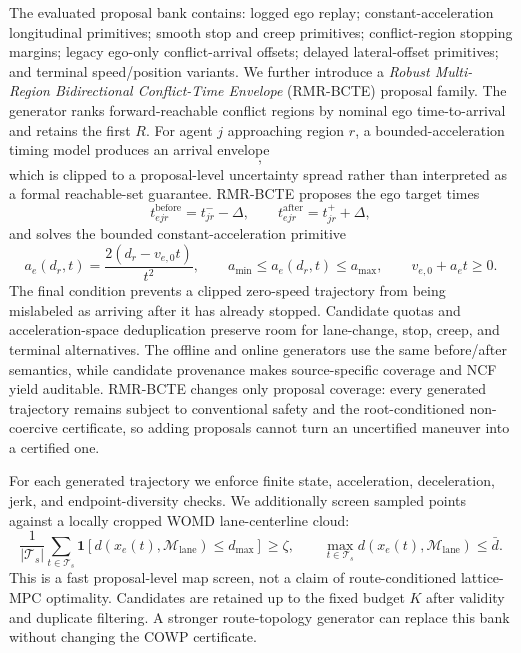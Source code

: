 \documentclass[10pt]{article}
\begin{document}
The evaluated proposal bank contains: logged ego replay; constant-acceleration longitudinal primitives; smooth stop and creep primitives; conflict-region stopping margins; legacy ego-only conflict-arrival offsets; delayed lateral-offset primitives; and terminal speed/position variants.  We further introduce a \emph{Robust Multi-Region Bidirectional Conflict-Time Envelope} (RMR-BCTE) proposal family.  The generator ranks forward-reachable conflict regions by nominal ego time-to-arrival and retains the first $R$.  For agent $j$ approaching region $r$, a bounded-acceleration timing model produces an arrival envelope
\begin{equation}
    [t^-_{jr},t^+_{jr}],
\end{equation}
which is clipped to a proposal-level uncertainty spread rather than interpreted as a formal reachable-set guarantee.  RMR-BCTE proposes the ego target times
\begin{equation}
    t^{\mathrm{before}}_{ejr}=t^-_{jr}-\Delta,
    \qquad
    t^{\mathrm{after}}_{ejr}=t^+_{jr}+\Delta,
\end{equation}
and solves the bounded constant-acceleration primitive
\begin{equation}
    a_e(d_r,t)=\frac{2(d_r-v_{e,0}t)}{t^2},
    \qquad
    a_{\min}\le a_e(d_r,t)\le a_{\max},
    \qquad
    v_{e,0}+a_e t\ge 0.
\end{equation}
The final condition prevents a clipped zero-speed trajectory from being mislabeled as arriving after it has already stopped.  Candidate quotas and acceleration-space deduplication preserve room for lane-change, stop, creep, and terminal alternatives.  The offline and online generators use the same before/after semantics, while candidate provenance makes source-specific coverage and NCF yield auditable.  RMR-BCTE changes only proposal coverage: every generated trajectory remains subject to conventional safety and the root-conditioned non-coercive certificate, so adding proposals cannot turn an uncertified maneuver into a certified one.

For each generated trajectory we enforce finite state, acceleration, deceleration, jerk, and endpoint-diversity checks. We additionally screen sampled points against a locally cropped WOMD lane-centerline cloud:
\begin{equation}
    \frac{1}{|\mathcal T_s|}
    \sum_{t\in\mathcal T_s}
    \mathbf 1[d(x_e(t),\mathcal M_{\mathrm{lane}})\le d_{\max}]
    \ge \zeta,
    \qquad
    \max_{t\in\mathcal T_s}d(x_e(t),\mathcal M_{\mathrm{lane}})\le \bar d.
\end{equation}
This is a fast proposal-level map screen, not a claim of route-conditioned lattice-MPC optimality. Candidates are retained up to the fixed budget $K$ after validity and duplicate filtering. A stronger route-topology generator can replace this bank without changing the COWP certificate.
\end{document}
